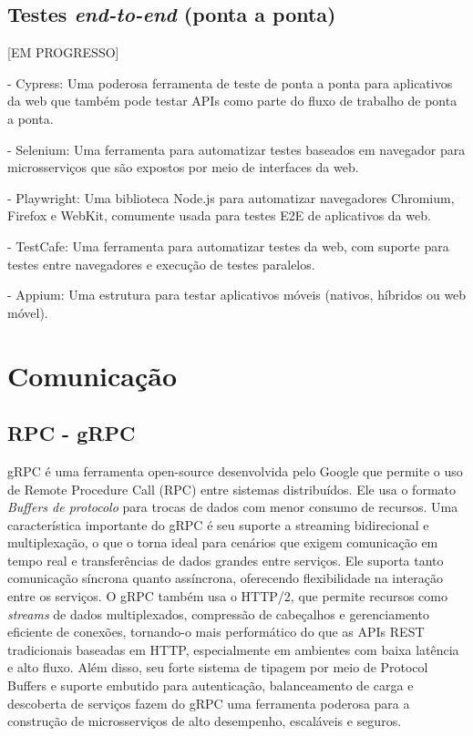 \subsection{Testes \emph{end-to-end} (ponta a ponta)}
[EM PROGRESSO]

- Cypress: Uma poderosa ferramenta de teste de ponta a ponta para aplicativos da web que também pode testar APIs como parte do fluxo de trabalho de ponta a ponta.

- Selenium: Uma ferramenta para automatizar testes baseados em navegador para microsserviços que são expostos por meio de interfaces da web.

- Playwright: Uma biblioteca Node.js para automatizar navegadores Chromium, Firefox e WebKit, comumente usada para testes E2E de aplicativos da web.

- TestCafe: Uma ferramenta para automatizar testes da web, com suporte para testes entre navegadores e execução de testes paralelos.

- Appium: Uma estrutura para testar aplicativos móveis (nativos, híbridos ou web móvel).

\section{Comunicação}

\subsection{RPC - gRPC}

gRPC é uma ferramenta open-source desenvolvida pelo Google que permite o uso de Remote Procedure Call (RPC) entre sistemas distribuídos. Ele usa o formato \emph{Buffers de protocolo} para trocas de dados com menor consumo de recursos. Uma característica importante do gRPC é seu suporte a streaming bidirecional e multiplexação, o que o torna ideal para cenários que exigem comunicação em tempo real e transferências de dados grandes entre serviços. Ele suporta tanto comunicação síncrona quanto assíncrona, oferecendo flexibilidade na interação entre os serviços. O gRPC também usa o HTTP/2, que permite recursos como \emph{streams} de dados multiplexados, compressão de cabeçalhos e gerenciamento eficiente de conexões, tornando-o mais performático do que as APIs REST tradicionais baseadas em HTTP, especialmente em ambientes com baixa latência e alto fluxo. Além disso, seu forte sistema de tipagem por meio de Protocol Buffers e suporte embutido para autenticação, balanceamento de carga e descoberta de serviços fazem do gRPC uma ferramenta poderosa para a construção de microsserviços de alto desempenho, escaláveis e seguros. \cite{grpc}

